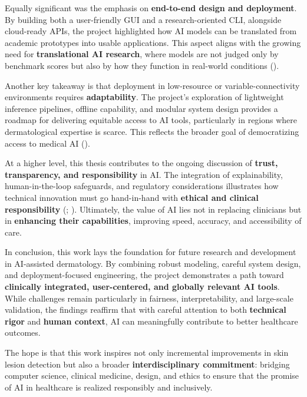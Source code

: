 \documentclass[
  12pt,
  oneside]{article}
\begin{document}
Equally significant was the emphasis on \textbf{end-to-end design and
deployment}. By building both a user-friendly GUI and a
research-oriented CLI, alongside cloud-ready APIs, the project
highlighted how AI models can be translated from academic prototypes
into usable applications. This aspect aligns with the growing need for
\textbf{translational AI research}, where models are not judged only by
benchmark scores but also by how they function in real-world conditions
().

Another key takeaway is that deployment in low-resource or
variable-connectivity environments requires \textbf{adaptability}. The
project's exploration of lightweight inference pipelines, offline
capability, and modular system design provides a roadmap for delivering
equitable access to AI tools, particularly in regions where
dermatological expertise is scarce. This reflects the broader goal of
democratizing access to medical AI
().

At a higher level, this thesis contributes to the ongoing discussion of
\textbf{trust, transparency, and responsibility} in AI. The integration
of explainability, human-in-the-loop safeguards, and regulatory
considerations illustrates how technical innovation must go hand-in-hand
with \textbf{ethical and clinical responsibility}
(;
). Ultimately, the
value of AI lies not in replacing clinicians but in \textbf{enhancing
their capabilities}, improving speed, accuracy, and accessibility of
care.

In conclusion, this work lays the foundation for future research and
development in AI-assisted dermatology. By combining robust modeling,
careful system design, and deployment-focused engineering, the project
demonstrates a path toward \textbf{clinically integrated, user-centered,
and globally relevant AI tools}. While challenges remain particularly in
fairness, interpretability, and large-scale validation, the findings
reaffirm that with careful attention to both \textbf{technical rigor}
and \textbf{human context}, AI can meaningfully contribute to better
healthcare outcomes.

The hope is that this work inspires not only incremental improvements in
skin lesion detection but also a broader \textbf{interdisciplinary
commitment}: bridging computer science, clinical medicine, design, and
ethics to ensure that the promise of AI in healthcare is realized
responsibly and inclusively.
\end{document}
